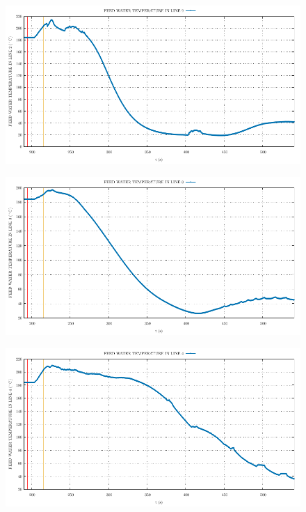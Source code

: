 \documentclass{article}
\begin{document}
\begin{multicols}{2}
\begin{figure}[H]
\end{figure}
\begin{figure}[H]
\centering
\includegraphics[width=\linewidth]{./graphs/FEED WATER TEMPERATURE IN LINE 2_comp.pdf}
\end{figure}
\begin{figure}[H]
\centering
\includegraphics[width=\linewidth]{./graphs/FEED WATER TEMPERATURE IN LINE 3_comp.pdf}
\end{figure}
\begin{figure}[H]
\centering
\includegraphics[width=\linewidth]{./graphs/FEED WATER TEMPERATURE IN LINE 4_comp.pdf}

\end{figure}
\end{multicols}
\end{document}
